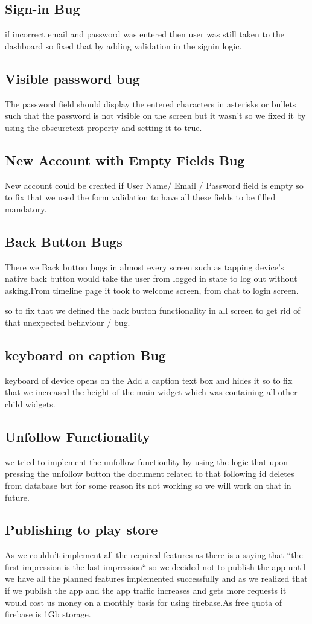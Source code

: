\subsection{Sign-in Bug}
if incorrect email and password was entered then user was still taken to the dashboard so fixed that by adding validation in the signin logic.
\subsection{Visible password bug}
The password field should display the entered characters in asterisks or bullets such that the password is not visible on the screen but it wasn't so we fixed it by using the obscuretext property and setting it to true.
\subsection{New Account with Empty Fields Bug}
New account could be created if User Name/ Email / Password field is empty so to fix that we used the form validation to have all these fields to be filled mandatory.
\subsection{Back Button Bugs}
There we Back button bugs in almost every screen such as tapping device's native back button would take the user from logged in state to log out without asking.From timeline page it took to welcome screen, from chat to login screen. 

so to fix that we defined the back button functionality in all screen to get rid of that unexpected behaviour / bug.
\subsection{keyboard on caption Bug}
keyboard of device opens on the Add a caption text box and hides it so to fix that we increased the height of the main widget which was containing all other child widgets.

\subsection{Unfollow Functionality}
we tried to implement the unfollow functionlity by using the logic that upon pressing the unfollow button the document related to that following id deletes from database but for some reason its not working so we will work on that in future.

\subsection{Publishing to play store}
As we couldn't implement all the required features as there is a saying that ``the first impression is the last impression`` so we decided not to publish the app until we have all the planned features implemented successfully and as we realized that if we publish the app and the app traffic increases and gets more requests it would cost us money on a monthly basis for using firebase.As free quota of firebase is 1Gb storage.

